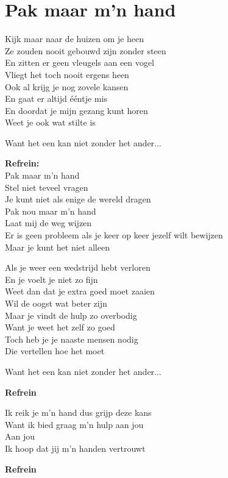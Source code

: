 \section{Pak maar m'n hand}
Kijk maar naar de huizen om je heen\\
Ze zouden nooit gebouwd zijn zonder steen\\
En zitten er geen vleugels aan een vogel\\
Vliegt het toch nooit ergens heen\\
Ook al krijg je nog zovele kansen\\
En gaat er altijd ééntje mis\\
En doordat je mijn gezang kunt horen\\
Weet je ook wat stilte is

Want het een kan niet zonder het ander...

\textbf{Refrein:}\\
Pak maar m'n hand\\
Stel niet teveel vragen\\
Je kunt niet als enige de wereld dragen\\
Pak nou maar m'n hand\\
Laat mij de weg wijzen\\
Er is geen probleem als je keer op keer jezelf wilt bewijzen\\
Maar je kunt het niet alleen

Als je weer een wedstrijd hebt verloren\\
En je voelt je niet zo fijn\\
Weet dan dat je extra goed moet zaaien\\
Wil de oogst wat beter zijn\\
Maar je vindt de hulp zo overbodig\\
Want je weet het zelf zo goed\\
Toch heb je je naaste mensen nodig\\
Die vertellen hoe het moet

Want het een kan niet zonder het ander...

\textbf{Refrein}

Ik reik je m'n hand dus grijp deze kans\\
Want ik bied graag m'n hulp aan jou\\
Aan jou\\
Ik hoop dat jij m'n handen vertrouwt

\textbf{Refrein}